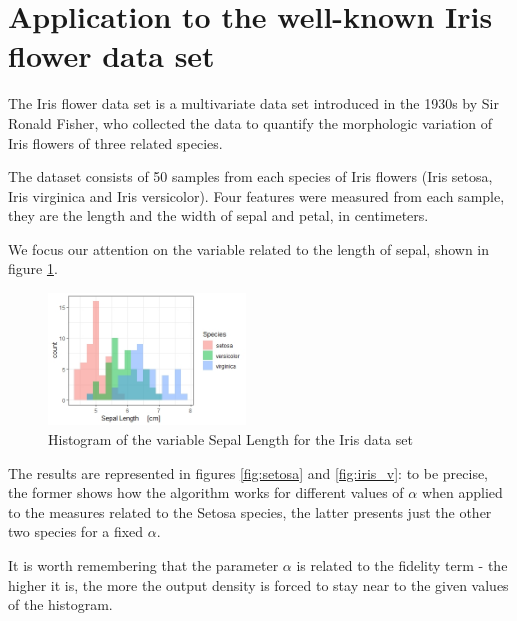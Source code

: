 \section{Application to the well-known Iris flower data set}
The Iris flower data set is a multivariate data set introduced in the 1930s by Sir Ronald Fisher, who collected the data to quantify the morphologic variation of Iris flowers of three related species.
 
The dataset consists of 50 samples from each species of Iris flowers (Iris setosa, Iris virginica and Iris versicolor). Four features were measured from each sample, they are the length and the width of sepal and petal, in centimeters. 

We focus our attention on the variable related to the length of sepal, shown in figure \ref{fig:iris}.

\begin{figure}
	\includegraphics[height=3.5cm]{./pictures/iris/iris.jpeg}
	\centering
	\caption{Histogram of the variable Sepal Length for the Iris data set}
	\label{fig:iris}	
\end{figure}

The results are represented in figures \ref{fig:setosa} and \ref{fig:iris_v}: to be precise, the former shows how the algorithm works for different values of $\alpha$ when applied to the measures related to the Setosa species, the latter presents just the other two species for a fixed $\alpha$. 

It is worth remembering that the parameter $\alpha$ is related to the fidelity term - the higher it is, the more the output density is forced to stay near to the given values of the histogram.

